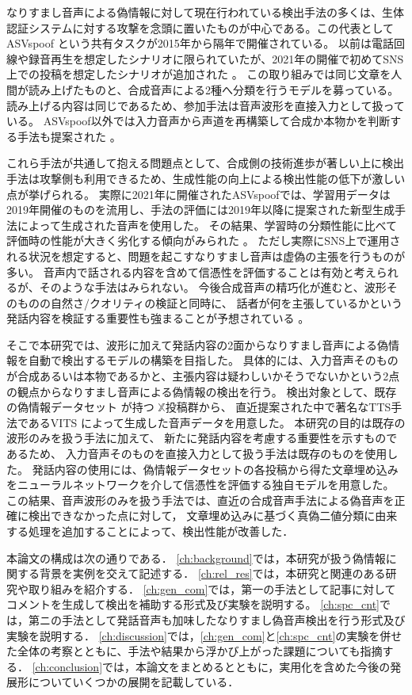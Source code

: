 なりすまし音声による偽情報に対して現在行われている検出手法の多くは、生体認証システムに対する攻撃を念頭に置いたものが中心である。この代表としてASVspoof \cite{7858696,kinnunen17_interspeech,todisco19_interspeech}という共有タスクが2015年から隔年で開催されている。
以前は電話回線や録音再生を想定したシナリオに限られていたが、2021年の開催で初めてSNS上での投稿を想定したシナリオが追加された \cite{yamagishi21_asvspoof}。
この取り組みでは同じ文章を人間が読み上げたものと、合成音声による2種へ分類を行うモデルを募っている。
読み上げる内容は同じであるため、参加手法は音声波形を直接入力として扱っている\cite{jung20c_interspeech,9746213}。
ASVspoof以外では入力音声から声道を再構築して合成か本物かを判断する手法も提案された \cite{280020}。

これら手法が共通して抱える問題点として、合成側の技術進歩が著しい上に検出手法は攻撃側も利用できるため、生成性能の向上による検出性能の低下が激しい点が挙げられる。
実際に2021年に開催されたASVspoofでは、学習用データは2019年開催のものを流用し、手法の評価には2019年以降に提案された新型生成手法によって生成された音声を使用した。
その結果、学習時の分類性能に比べて評価時の性能が大きく劣化する傾向がみられた \cite{yamagishi21_asvspoof,yu_icmece}。
ただし実際にSNS上で運用される状況を想定すると、問題を起こすなりすまし音声は虚偽の主張を行うものが多い。
音声内で話される内容を含めて信憑性を評価することは有効と考えられるが、そのような手法はみられない。
今後合成音声の精巧化が進むと、波形そのものの自然さ/クオリティの検証と同時に、
話者が何を主張しているかという発話内容を検証する重要性も強まることが予想されている \cite{10208955}。

そこで本研究では、波形に加えて発話内容の2面からなりすまし音声による偽情報を自動で検出するモデルの構築を目指した。
具体的には、入力音声そのものが合成あるいは本物であるかと、主張内容は疑わしいかそうでないかという2点の観点からなりすまし音声による偽情報の検出を行う。
検出対象として、既存の偽情報データセット \cite{10.1145/3477495.3531744}が持つ $\mathbb{X}$投稿群から、
直近提案された中で著名なTTS手法であるVITS \cite{pmlr-v139-kim21f}によって生成した音声データを用意した。
本研究の目的は既存の波形のみを扱う手法に加えて、
新たに発話内容を考慮する重要性を示すものであるため、
入力音声そのものを直接入力として扱う手法は既存のものを使用した。
発話内容の使用には、偽情報データセットの各投稿から得た文章埋め込みをニューラルネットワークを介して信憑性を評価する独自モデルを用意した。
この結果、音声波形のみを扱う手法では、直近の合成音声手法による偽音声を正確に検出できなかった点に対して，
文章埋め込みに基づく真偽二値分類に由来する処理を追加することによって、検出性能が改善した．


本論文の構成は次の通りである．
\cref{ch:background}では，本研究が扱う偽情報に関する背景を実例を交えて記述する．
\cref{ch:rel_res}では，本研究と関連のある研究や取り組みを紹介する．
\cref{ch:gen_com}では，第一の手法として記事に対してコメントを生成して検出を補助する形式及び実験を説明する。
\cref{ch:spc_cnt}では，第ニの手法として発話音声も加味したなりすまし偽音声検出を行う形式及び実験を説明する．
\cref{ch:discussion}では，\cref{ch:gen_com}と\cref{ch:spc_cnt}の実験を併せた全体の考察とともに、手法や結果から浮かび上がった課題についても指摘する．
\cref{ch:conclusion}では，本論文をまとめるとともに，実用化を含めた今後の発展形についていくつかの展開を記載している．